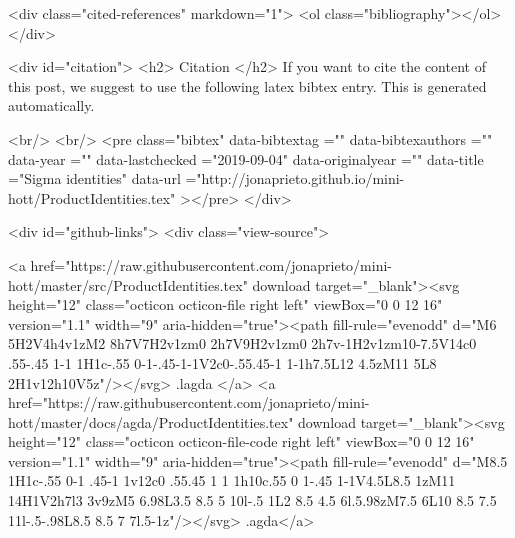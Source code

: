   <div class="cited-references" markdown="1">
  <ol class="bibliography"></ol>
  </div>


  
  <div id="citation">
  <h2> Citation </h2>
  If you want to cite the content of this post,
  we suggest to use the following latex bibtex entry.
  This is generated automatically.

  <br/>
  <br/>
  <pre class="bibtex"
       data-bibtextag =""
       data-bibtexauthors =""
       data-year =""
       data-lastchecked ="2019-09-04"
       data-originalyear =""
       data-title ="Sigma identities"
       data-url ="http://jonaprieto.github.io/mini-hott/ProductIdentities.tex"
  ></pre>
  </div>
  

  <div id="github-links">
    <div class="view-source">
      
        <a href="https://raw.githubusercontent.com/jonaprieto/mini-hott/master/src/ProductIdentities.tex" download target="_blank"><svg height="12" class="octicon octicon-file right left" viewBox="0 0 12 16" version="1.1" width="9" aria-hidden="true"><path fill-rule="evenodd" d="M6 5H2V4h4v1zM2 8h7V7H2v1zm0 2h7V9H2v1zm0 2h7v-1H2v1zm10-7.5V14c0 .55-.45 1-1 1H1c-.55 0-1-.45-1-1V2c0-.55.45-1 1-1h7.5L12 4.5zM11 5L8 2H1v12h10V5z"/></svg> .lagda </a>
        <a href="https://raw.githubusercontent.com/jonaprieto/mini-hott/master/docs/agda/ProductIdentities.tex" download target="_blank"><svg height="12" class="octicon octicon-file-code right left" viewBox="0 0 12 16" version="1.1" width="9" aria-hidden="true"><path fill-rule="evenodd" d="M8.5 1H1c-.55 0-1 .45-1 1v12c0 .55.45 1 1 1h10c.55 0 1-.45 1-1V4.5L8.5 1zM11 14H1V2h7l3 3v9zM5 6.98L3.5 8.5 5 10l-.5 1L2 8.5 4.5 6l.5.98zM7.5 6L10 8.5 7.5 11l-.5-.98L8.5 8.5 7 7l.5-1z"/></svg> .agda</a>
      
